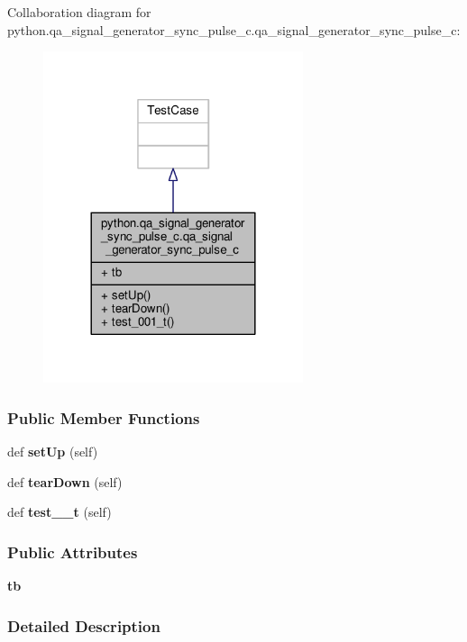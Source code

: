 Collaboration diagram for python.\+qa\+\_\+signal\+\_\+generator\+\_\+sync\+\_\+pulse\+\_\+c.\+qa\+\_\+signal\+\_\+generator\+\_\+sync\+\_\+pulse\+\_\+c\+:
\nopagebreak
\begin{figure}[H]
\begin{center}
\leavevmode
\includegraphics[width=216pt]{d4/d4c/classpython_1_1qa__signal__generator__sync__pulse__c_1_1qa__signal__generator__sync__pulse__c__coll__graph}
\end{center}
\end{figure}
\subsubsection*{Public Member Functions}
\begin{DoxyCompactItemize}
\item 
def {\bf set\+Up} (self)
\item 
def {\bf tear\+Down} (self)
\item 
def {\bf test\+\_\+\_\+t} (self)
\end{DoxyCompactItemize}
\subsubsection*{Public Attributes}
\begin{DoxyCompactItemize}
\item 
{\bf tb}
\end{DoxyCompactItemize}


\subsubsection{Detailed Description}


